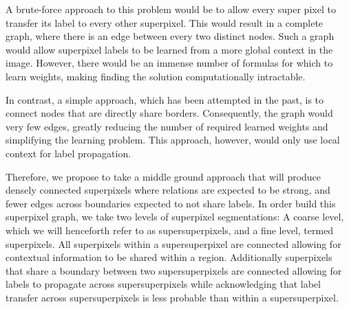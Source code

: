 \documentclass{article} %
\begin{document}
A brute-force approach to this problem would be to allow every super pixel to transfer its label to every other superpixel. This would result in a complete graph, where there is an edge between every two distinct nodes. Such a graph would allow superpixel labels to be learned from a more global context in the image. However, there would be an immense number of formulas for which to learn weights, making finding the solution computationally intractable. 

In contrast, a simple approach, which has been attempted in the past, \cite{} %
is to connect nodes that are directly share borders. Consequently, the graph would very few edges, greatly reducing the number of required learned weights and simplifying the learning problem. This approach, however, would only use local context for label propagation.

Therefore, we propose to take a middle ground approach that will produce densely connected superpixels where relations are expected to be strong, and fewer edges across boundaries expected to not share labels. In order build this superpixel graph, we take two levels of superpixel segmentations: A coarse level, which we will henceforth refer to as supersuperpixels, and a fine level, termed superpixels. All superpixels within a supersuperpixel are connected allowing for contextual information to be shared within a region. Additionally superpixels that share a boundary between two supersuperpixels are connected allowing for labels to propagate across supersuperpixels while acknowledging that label transfer across supersuperpixels is less probable than within a supersuperpixel.
\end{document}
